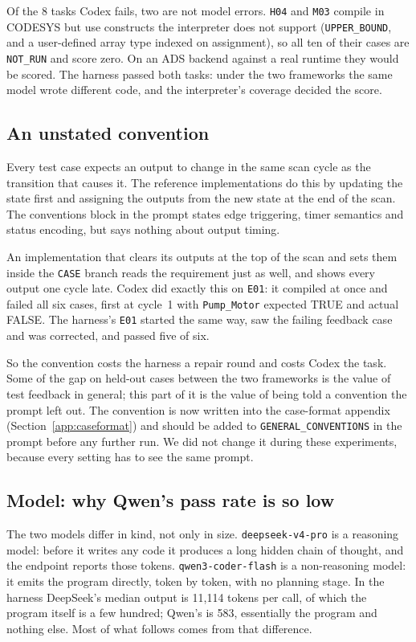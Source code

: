 Of the 8 tasks Codex fails, two are not model errors. \texttt{H04} and
\texttt{M03} compile in CODESYS but use constructs the interpreter does not
support (\texttt{UPPER\_BOUND}, and a user-defined array type indexed on
assignment), so all ten of their cases are \texttt{NOT\_RUN} and score zero. On
an ADS backend against a real runtime they would be scored. The harness passed
both tasks: under the two frameworks the same model wrote different code, and
the interpreter's coverage decided the score.

\subsection{An unstated convention}
\label{sec:convention}

Every test case expects an output to change in the same scan cycle as the
transition that causes it. The reference implementations do this by updating
the state first and assigning the outputs from the new state at the end of the
scan. The conventions block in the prompt states edge triggering, timer
semantics and status encoding, but says nothing about output timing.

An implementation that clears its outputs at the top of the scan and sets
them inside the \texttt{CASE} branch reads the requirement just as well, and
shows every output one cycle late. Codex did exactly this on \texttt{E01}: it
compiled at once and failed all six cases, first at cycle~1 with
\texttt{Pump\_Motor} expected TRUE and actual FALSE. The harness's \texttt{E01}
started the same way, saw the failing feedback case and was corrected, and
passed five of six.

So the convention costs the harness a repair round and costs Codex the task.
Some of the gap on held-out cases between the two frameworks is the value of
test feedback in general; this part of it is the value of being told a
convention the prompt left out. The convention is now written into the
case-format appendix (Section~\ref{app:caseformat}) and should be added to
\texttt{GENERAL\_CONVENTIONS} in the prompt before any further run. We did not
change it during these experiments, because every setting has to see the same
prompt.

\subsection{Model: why Qwen's pass rate is so low}

The two models differ in kind, not only in size. \texttt{deepseek-v4-pro} is a
reasoning model: before it writes any code it produces a long hidden chain of
thought, and the endpoint reports those tokens. \texttt{qwen3-coder-flash} is a
non-reasoning model: it emits the program directly, token by token, with no
planning stage. In the harness DeepSeek's median output is 11{,}114 tokens per
call, of which the program itself is a few hundred; Qwen's is 583, essentially
the program and nothing else. Most of what follows comes from that difference.


